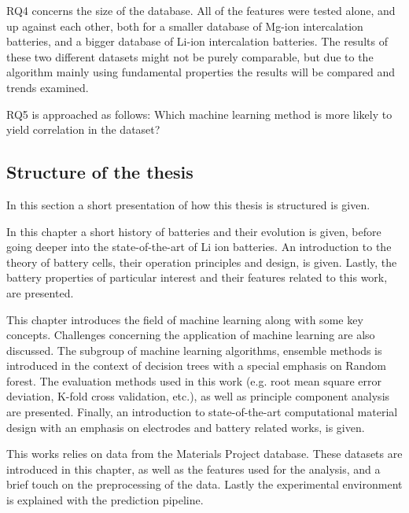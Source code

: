 RQ4 concerns the size of the database. All of the features were tested alone, and up against each other, both for a smaller database of Mg-ion intercalation batteries, and a bigger database of Li-ion intercalation batteries. The results of these two different datasets might not be purely comparable, but due to the algorithm mainly using fundamental properties the results will be compared and trends examined. 

RQ5 is approached as follows: Which machine learning method is more likely to yield correlation in the dataset?

\subsection{Structure of the thesis}
In this section a short presentation of how this thesis is structured is given. 



	In this chapter a short history of batteries and their evolution is given, before going deeper into the state-of-the-art of Li ion batteries. An introduction to the theory of battery cells, their operation principles and design, is given. Lastly, the battery properties of particular interest and their features related to this work, are presented. 


This chapter introduces the field of machine learning along with some key concepts. Challenges concerning the application of machine learning are also discussed. The subgroup of machine learning algorithms, ensemble methods is introduced in the context of decision trees with a special emphasis on Random forest. The evaluation methods used in this work (e.g. root mean square error deviation, K-fold cross validation, etc.), as well as principle component analysis are presented. Finally, an introduction to state-of-the-art computational material design with an emphasis on electrodes and battery related works, is given. 




This works relies on data from the Materials Project database. These datasets are introduced in this chapter, as well as the features used for the analysis, and a brief touch on the preprocessing of the data. Lastly the experimental environment is explained with the prediction pipeline. 


